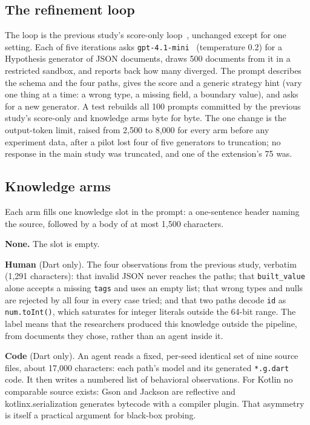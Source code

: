 \subsection{The refinement loop}

The loop is the previous study's score-only loop~\dartcite, unchanged
except for one setting. Each of five iterations asks \texttt{gpt-4.1-mini}~\cite{openai2025gpt41}
(temperature 0.2) for a Hypothesis generator of JSON documents, draws 500
documents from it in a restricted sandbox, and reports back how many
diverged. The prompt describes the schema and the four paths, gives the
score and a generic strategy hint (vary one thing at a time: a wrong type, a
missing field, a boundary value), and asks for a new generator. A test
rebuilds all 100 prompts committed by the previous study's score-only and
knowledge arms byte for byte. The one change is the output-token limit,
raised from 2{,}500 to 8{,}000 for every arm before any experiment data, after
a pilot lost four of five generators to truncation; no response in the main
study was truncated, and one of the extension's 75 was.

\subsection{Knowledge arms}

Each arm fills one knowledge slot in the prompt: a one-sentence header naming
the source, followed by a body of at most 1{,}500 characters.

\textbf{None.} The slot is empty.

\textbf{Human} (Dart only). The four observations from the previous study,
verbatim (1{,}291 characters): that invalid JSON never reaches the paths;
that \texttt{built\_value} alone accepts a missing \texttt{tags} and uses
an empty list; that wrong types and nulls are rejected by all four in every
case tried; and that two paths decode \texttt{id} as \texttt{num.toInt()},
which saturates for integer literals outside the 64-bit range. The label
means that the researchers produced this knowledge outside the pipeline,
from documents they chose, rather than an agent inside it.

\textbf{Code} (Dart only). An agent reads a fixed, per-seed identical set
of nine source files, about 17{,}000 characters: each path's model and its
generated \texttt{*.g.dart} code. It then writes a numbered list of
behavioral observations. For Kotlin no comparable source exists: Gson and
Jackson are reflective and kotlinx.serialization generates bytecode with a
compiler plugin. That asymmetry is itself a practical argument for black-box
probing.

